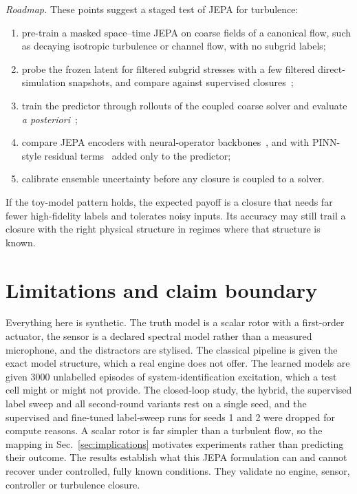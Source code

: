 \documentclass[10pt,journal]{IEEEtran}
\begin{document}
\emph{Roadmap.} These points suggest a staged test of JEPA for turbulence:
\begin{enumerate}
\item pre-train a masked space--time JEPA on coarse fields of a canonical flow, such as decaying isotropic turbulence or channel flow, with no subgrid labels;
\item probe the frozen latent for filtered subgrid stresses with a few filtered direct-simulation snapshots, and compare against supervised closures~\cite{beck2019les,maulik2019subgrid};
\item train the predictor through rollouts of the coupled coarse solver and evaluate \emph{a posteriori}~\cite{kochkov2021mlcfd};
\item compare JEPA encoders with neural-operator backbones~\cite{li2021fno,lu2021deeponet}, and with PINN-style residual terms~\cite{raissi2017pinn} added only to the predictor;
\item calibrate ensemble uncertainty before any closure is coupled to a solver.
\end{enumerate}
If the toy-model pattern holds, the expected payoff is a closure that needs far fewer high-fidelity labels and tolerates noisy inputs. Its accuracy may still trail a closure with the right physical structure in regimes where that structure is known.

\section{Limitations and claim boundary}
Everything here is synthetic. The truth model is a scalar rotor with a first-order actuator, the sensor is a declared spectral model rather than a measured microphone, and the distractors are stylised. The classical pipeline is given the exact model structure, which a real engine does not offer. The learned models are given 3000 unlabelled episodes of system-identification excitation, which a test cell might or might not provide. The closed-loop study, the hybrid, the supervised label sweep and all second-round variants rest on a single seed, and the supervised and fine-tuned label-sweep runs for seeds 1 and 2 were dropped for compute reasons. A scalar rotor is far simpler than a turbulent flow, so the mapping in Sec.~\ref{sec:implications} motivates experiments rather than predicting their outcome. The results establish what this JEPA formulation can and cannot recover under controlled, fully known conditions. They validate no engine, sensor, controller or turbulence closure.
\end{document}
